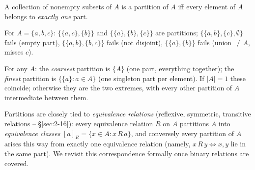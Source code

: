 \begin{note}
A collection of nonempty subsets of $A$ is a partition of $A$ iff every element of $A$ belongs to \emph{exactly one} part.
\end{note}

\begin{example}
For $A = \{a,b,c\}$: $\{\{a,c\},\{b\}\}$ and $\{\{a\},\{b\},\{c\}\}$ are partitions; $\{\{a,b\},\{c\},\emptyset\}$ fails (empty part), $\{\{a,b\},\{b,c\}\}$ fails (not disjoint), $\{\{a\},\{b\}\}$ fails (union $\neq A$, misses $c$).
\end{example}

\begin{definition}
For any $A$: the \emph{coarsest} partition is $\{A\}$ (one part, everything together); the \emph{finest} partition is $\{\{a\} : a \in A\}$ (one singleton part per element). If $|A|=1$ these coincide; otherwise they are the two extremes, with every other partition of $A$ intermediate between them.
\end{definition}

\begin{note}
Partitions are closely tied to \emph{equivalence relations} (reflexive, symmetric, transitive relations -- \S\ref{sec:2-16}): every equivalence relation $R$ on $A$ partitions $A$ into \emph{equivalence classes} $[a]_R = \{x \in A : x\,R\,a\}$, and conversely every partition of $A$ arises this way from exactly one equivalence relation (namely, $x\,R\,y \iff x,y$ lie in the same part). We revisit this correspondence formally once binary relations are covered.
\end{note}

